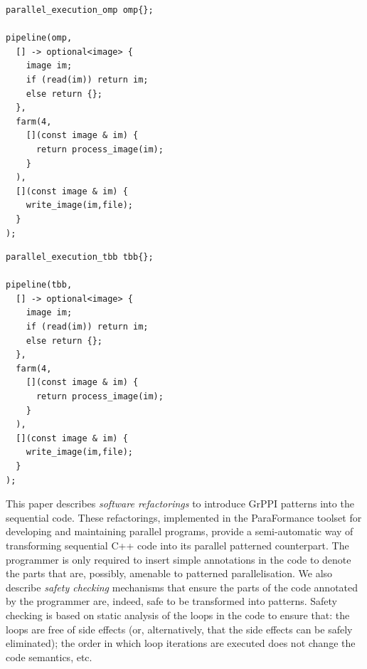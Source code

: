 \begin{table}
\noindent\begin{minipage}{.46\columnwidth}
\begin{lstlisting}[caption={Example targeting OpenMP},label={lst:grppi-omp}]
parallel_execution_omp omp{};

pipeline(omp,
  [] -> optional<image> {
    image im;
    if (read(im)) return im;
    else return {};
  },
  farm(4,
    [](const image & im) { 
      return process_image(im); 
    }
  ),
  [](const image & im) { 
    write_image(im,file); 
  }
);
\end{lstlisting}
\end{minipage}
\noindent\begin{minipage}{.05\columnwidth}\hfill
\end{minipage}
\noindent\begin{minipage}{.46\columnwidth}\hfill
\begin{lstlisting}[caption={Example targeting TBB},label={lst:grppi-tbb}]
parallel_execution_tbb tbb{};

pipeline(tbb,
  [] -> optional<image> {
    image im;
    if (read(im)) return im;
    else return {};
  },
  farm(4,
    [](const image & im) { 
      return process_image(im); 
    }
  ),
  [](const image & im) { 
    write_image(im,file); 
  }
);  
\end{lstlisting}
\end{minipage}
\end{table}

This paper describes \emph{software refactorings} to introduce GrPPI patterns into the sequential code. These refactorings, implemented in the ParaFormance toolset for developing and maintaining parallel programs, provide a semi-automatic way of transforming sequential C++ code into its parallel patterned counterpart. The programmer is only required to insert simple annotations in the code to denote the parts that are, possibly, amenable to patterned parallelisation. We also describe \emph{safety checking} mechanisms that ensure the parts of the code annotated by the programmer are, indeed, safe to be transformed into patterns. Safety checking is based on static analysis of the loops in the code to ensure that: the loops are free of side effects (or, alternatively, that the side effects can be safely eliminated); the order in which loop iterations are executed does not change the code semantics, etc. 


